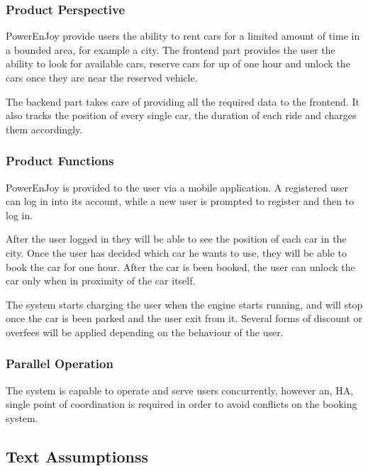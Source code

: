 \documentclass[11pt]{article} %
\newcommand{\pe}{PowerEnJoy }
\begin{document}
\subsubsection{Product Perspective}
  
  \pe provide users the ability to rent cars for a limited amount of time in a bounded area, for example a city. 
  The frontend part provides the user the ability to look for available cars, reserve cars for up of one hour and unlock the cars once they are near the reserved vehicle.

  The backend part takes care of providing all the required data to the frontend. It also tracks the position of every single car, the duration of each ride and charges them accordingly.
  
  \subsubsection{Product Functions}
  
  \pe is provided to the user via a mobile application. A registered user can log in into its account, while a new user is prompted to register and then to log in.
  
  After the user logged in they will be able to see the position of each car in the city. Once the user has decided which car he wants to use, they will be able to book the car for one hour. After the car is been booked, the user can unlock the car only when in proximity of the car itself.
  
  The system starts charging the user when the engine starts running, and will stop once the car is been parked and the user exit from it. Several forms of discount or overfees will be applied depending on the behaviour of the user.

  \subsubsection{Parallel Operation}
  The system is capable to operate and serve users concurrently, however an, HA, single point of coordination is required in order to avoid conflicts on the booking system.
  

\subsection{Text Assumptionss}
  
\end{document}
